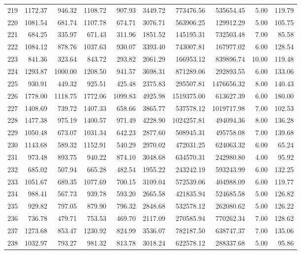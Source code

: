 \begin{tabular}{lrrrrrrrrr}
219 & 1172.37 & 946.32 & 1108.72 & 907.93 & 3449.72 & 773476.56 & 535654.45 & 5.00 & 119.79 \\
220 & 1081.54 & 681.74 & 1107.78 & 674.71 & 3076.71 & 563906.25 & 129912.29 & 5.00 & 105.75 \\
221 & 684.25 & 335.97 & 671.43 & 311.96 & 1851.52 & 145195.31 & 732503.48 & 7.00 & 85.58 \\
222 & 1084.12 & 878.76 & 1037.63 & 930.07 & 3393.40 & 743007.81 & 167977.02 & 6.00 & 128.54 \\
223 & 841.36 & 323.64 & 843.72 & 293.82 & 2061.29 & 166953.12 & 839896.74 & 10.00 & 119.48 \\
224 & 1293.87 & 1000.00 & 1208.50 & 941.57 & 3698.31 & 871289.06 & 292893.55 & 6.00 & 133.06 \\
225 & 930.91 & 449.32 & 925.51 & 425.48 & 2375.83 & 295507.81 & 1476656.32 & 8.00 & 140.43 \\
226 & 1778.00 & 1118.75 & 1772.06 & 1099.83 & 4925.98 & 1519375.00 & 613627.39 & 6.00 & 180.00 \\
227 & 1408.69 & 739.72 & 1407.33 & 658.66 & 3865.77 & 537578.12 & 1019717.98 & 7.00 & 102.53 \\
228 & 1477.38 & 975.19 & 1400.57 & 971.49 & 4228.90 & 1024257.81 & 494094.36 & 8.00 & 136.28 \\
229 & 1050.48 & 673.07 & 1031.34 & 642.23 & 2877.60 & 508945.31 & 495758.08 & 7.00 & 139.68 \\
230 & 1143.68 & 589.32 & 1152.91 & 540.29 & 2970.02 & 472031.25 & 624063.32 & 6.00 & 65.24 \\
231 & 973.48 & 893.75 & 940.22 & 874.10 & 3048.68 & 634570.31 & 242980.80 & 4.00 & 95.92 \\
232 & 685.02 & 507.94 & 665.28 & 482.54 & 1955.22 & 243242.19 & 593243.99 & 6.00 & 132.25 \\
233 & 1051.67 & 689.35 & 1077.69 & 700.15 & 3109.04 & 572539.06 & 404988.09 & 6.00 & 119.77 \\
234 & 988.41 & 567.73 & 939.78 & 593.20 & 2665.58 & 421835.94 & 524685.58 & 5.00 & 126.82 \\
235 & 929.82 & 797.05 & 879.90 & 796.32 & 2848.68 & 532578.12 & 262080.62 & 5.00 & 126.22 \\
236 & 736.78 & 479.71 & 753.53 & 469.70 & 2117.09 & 270585.94 & 770262.34 & 7.00 & 128.62 \\
237 & 1273.68 & 853.47 & 1230.92 & 824.99 & 3536.07 & 782187.50 & 638747.37 & 7.00 & 135.06 \\
238 & 1032.97 & 793.27 & 981.32 & 813.78 & 3018.24 & 622578.12 & 288337.68 & 5.00 & 95.86 \\

\end{tabular}
